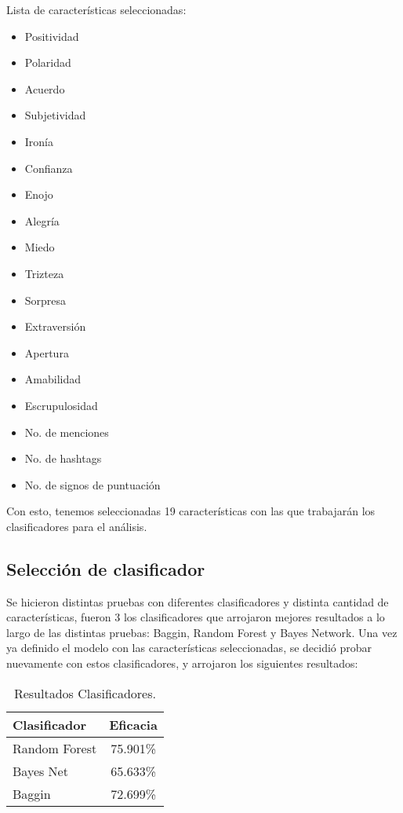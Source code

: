 \documentclass[runningheads]{llncs}
\begin{document}
Lista de características seleccionadas:

\begin{multicols}{3}
    \begin{itemize}
        \item Positividad
        \item Polaridad
        \item Acuerdo
        \item Subjetividad
        \item Ironía
        \item Confianza
        \item Enojo
        \item Alegría
        \item Miedo
        \item Trizteza
        \item Sorpresa
        \item Extraversión
        \item Apertura
        \item Amabilidad
        \item Escrupulosidad
        \item No. de menciones
        \item No. de hashtags
        \item No. de signos de puntuación
    \end{itemize}
\end{multicols}
Con esto, tenemos seleccionadas 19 características con las que trabajarán los clasificadores para el análisis.

\subsection{Selección de clasificador}
Se hicieron distintas pruebas con diferentes clasificadores y distinta cantidad de características, fueron 3 los clasificadores que arrojaron mejores resultados a lo largo de las distintas pruebas: Baggin, Random Forest y Bayes Network. 
Una vez ya definido el modelo con las características seleccionadas, se decidió probar nuevamente con estos clasificadores, y arrojaron los siguientes resultados:

\begin{table}
\centering
\caption{Resultados Clasificadores.}\label{tab2}
\begin{tabular}{|l|c|}
\hline
{\bfseries Clasificador} & {\bfseries Eficacia}\\ \hline
Random Forest & 75.901\% \\ \hline
Bayes Net & 65.633\% \\ \hline
Baggin & 72.699\% \\ \hline
\end{tabular}
\end{table}
\end{document}
